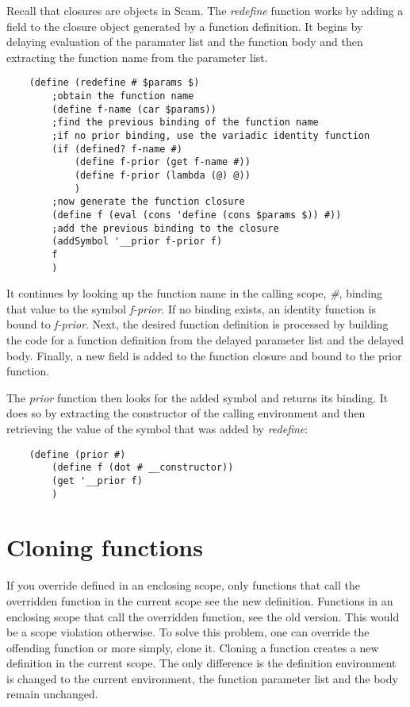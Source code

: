 Recall that closures are objects in Scam.
The {\it redefine} function works by adding a field to the closure
object generated by a function definition. It begins by
delaying evaluation of the paramater list and the function
body and then extracting the function name from the parameter list.

\begin{verbatim}
    (define (redefine # $params $)
        ;obtain the function name
        (define f-name (car $params))
        ;find the previous binding of the function name
        ;if no prior binding, use the variadic identity function 
        (if (defined? f-name #)
            (define f-prior (get f-name #))
            (define f-prior (lambda (@) @))
            )
        ;now generate the function closure
        (define f (eval (cons 'define (cons $params $)) #))
        ;add the previous binding to the closure
        (addSymbol '__prior f-prior f)
        f
        )
\end{verbatim}

It continues by looking up the function name in the calling scope, {\it \#},
binding that value to the symbol {\it f-prior}. If no binding exists,
an identity function is bound to {\it f-prior}.
Next, the desired function definition is processed by building
the code for a function definition from the delayed parameter list
and the delayed body.
Finally, a new field is added to the function closure and bound
to the prior function.

The {\it prior} function then looks for the added symbol and returns
its binding. It does so by extracting the constructor of the calling
environment and then retrieving the value of the symbol that was 
added by {\it redefine}:

\begin{verbatim}
    (define (prior #)
        (define f (dot # __constructor))
        (get '__prior f)
        )
\end{verbatim}

\section{Cloning functions}

If you override defined in an enclosing scope, only functions that
call the overridden function in the current scope see the new definition.
Functions in an enclosing scope that call the overridden function,
see the old version. This would be a scope violation otherwise.
To solve this problem, one can override the offending function
or more simply, clone it. Cloning a function creates a new
definition in the current scope. The only difference is the
definition environment is changed to the current environment,
the function parameter list and the body remain unchanged.


